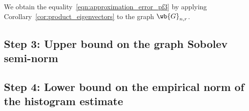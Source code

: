 \documentclass{article}
\newcommand{\1}{\mathbf{1}}
\theoremstyle{alden}
\theoremstyle{aldenthm}
\theoremstyle{definition}
\theoremstyle{remark}
\begin{document}
We obtain the equality~\eqref{eqn:approximation_error_pf3} by applying Corollary~\ref{cor:product_eigenvectors} to the graph $\wb{G}_{n,r}$.

\subsection{Step 3: Upper bound on the graph Sobolev semi-norm}

\subsection{Step 4: Lower bound on the empirical norm of the histogram estimate}

 
\end{document}
